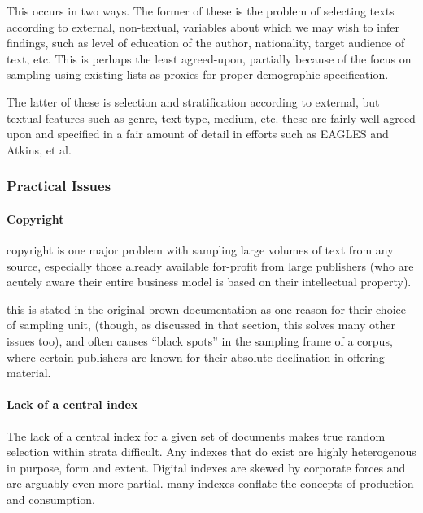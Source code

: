 This occurs in two ways. The former of these is the problem of selecting texts according to external, non-textual, variables about which we may wish to infer findings, such as level of education of the author, nationality, target audience of text, etc. This is perhaps the least agreed-upon, partially because of the focus on sampling using existing lists as proxies for proper demographic specification.

The latter of these is selection and stratification according to external, but textual features such as genre, text type, medium, etc. these are fairly well agreed upon and specified in a fair amount of detail in efforts such as EAGLES and Atkins, et al.  








\subsubsection{Practical Issues}

\paragraph{Copyright}
copyright is one major problem with sampling large volumes of text from any source, especially those already available for-profit from large publishers (who are acutely aware their entire business model is based on their intellectual property).

this is stated in the original brown documentation as one reason for their choice of sampling unit, (though, as discussed in that section, this solves many other issues too), and often causes ``black spots'' in the sampling frame of a corpus, where certain publishers are known for their absolute declination in offering material.


\paragraph{Lack of a central index}
The lack of a central index for a given set of documents makes true random selection within strata difficult. Any indexes that do exist are highly heterogenous in purpose, form and extent. Digital indexes are skewed by corporate forces and are arguably even more partial.  many indexes conflate the concepts of production and consumption.

